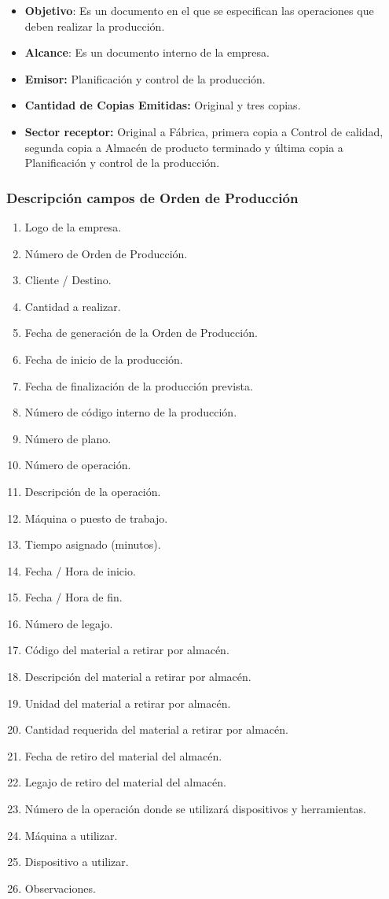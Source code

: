 \pagebreak
\begin{itemize}
 \item \textbf{Objetivo}: Es un documento en el que se especifican las operaciones que deben realizar la producci\'on.
 \item \textbf{Alcance}: Es un documento interno de la empresa.
 \item \textbf{Emisor:} Planificaci\'on y control de la producci\'on.
 \item \textbf{Cantidad de Copias Emitidas:} Original y tres copias.
 \item \textbf{Sector receptor:} Original a F\'abrica, primera copia a Control de calidad, segunda copia a Almac\'en de producto terminado y \'ultima copia a Planificaci\'on y control de la producci\'on.
\end{itemize}

\subsubsection{Descripción campos de Orden de Producci\'on}
\begin{enumerate}
 \item Logo de la empresa.
 \item Número de Orden de Producci\'on.
 \item Cliente / Destino.
 \item Cantidad a realizar.
 \item Fecha de generaci\'on de la Orden de Producci\'on.
 \item Fecha de inicio de la producción.
 \item Fecha de finalización de la producción prevista.
 \item N\'umero de código interno de la producci\'on.
 \item N\'umero de plano.
 \item N\'umero de operaci\'on.
 \item Descripci\'on de la operaci\'on.
 \item M\'aquina o puesto de trabajo.
 \item Tiempo asignado (minutos).
 \item Fecha / Hora de inicio.
 \item Fecha / Hora de fin.
 \item N\'umero de legajo.
 \item C\'odigo del material a retirar por almac\'en.
 \item Descripci\'on del material a retirar por almac\'en.
 \item Unidad del material a retirar por almac\'en.
 \item Cantidad requerida del material a retirar por almac\'en.
 \item Fecha de retiro del material del almac\'en.
 \item Legajo de retiro del material del almac\'en.
 \item N\'umero de la operaci\'on donde se utilizar\'a dispositivos y herramientas.
 \item M\'aquina a utilizar.
 \item Dispositivo a utilizar.
 \item Observaciones.
\end{enumerate}


